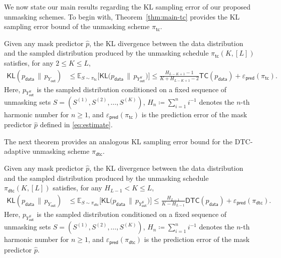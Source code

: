 \documentclass[english]{article}
\newcommand{\defn}{\coloneqq}
\newcommand{\KL}{\mathsf{KL}}
\newcommand{\wh}{\widehat}
\newcommand{\data}{\mathsf{data}}
\newcommand{\veps}{\varepsilon}
\newcommand{\E}{\mathbb{E}}
\newcommand{\TC}{\mathsf{TC}}
\newcommand{\DTC}{\mathsf{DTC}}
\newcommand{\tc}{\mathsf{tc}}
\newcommand{\dtc}{\mathsf{dtc}}
\newcommand{\train}{\mathsf{pred}}
\newcommand{\out}{\mathsf{out}}
\begin{document}
We now state our main results regarding the KL sampling error of our proposed unmasking schemes.
To begin with, Theorem~\ref{thm:main-tc} provides the KL sampling error bound of the unmasking scheme $\pi_{\tc}$. 
\begin{theorem}\label{thm:main-tc}
Given any mask predictor $\wh p$, the KL divergence between the data distribution  and the sampled distribution produced by the unmasking schedule $\pi_{\tc}(K, [L])$ 
satisfies, for any $2 \leq K \leq L$,
\begin{align}\label{eq:main-results-tc}
 \KL(p_{\data} \,\|\, p_{Y_\out}) 
 &\leq \E_{S\sim \pi_{\tc}}\big[\KL(p_{\data} \,\|\, p_{Y_\out^S}\big)\big] \leq \frac{H_{L-K+1} - 1}{K + H_{L-K+1} - 2}  \TC(p_\data) + \veps_{\train}(\pi_{\tc}).
\end{align}
Here, $p_{Y_\out^S} $ is the sampled distribution conditioned on a fixed sequence of unmasking sets $S = (S^{(1)}, S^{(2)}, \ldots, S^{(K)})$,
$H_n \defn \sum_{i=1}^{n} i^{-1}$ denotes the $n$-th harmonic number for $n \geq 1$, and
$\veps_{\train}(\pi_{\tc})$ is the prediction error of the mask predictor $\wh p$ defined in \eqref{eq:estimate}.
\end{theorem}

The next theorem provides an analogous KL sampling error bound for the DTC-adaptive unmasking scheme $\pi_{\dtc}$.
\begin{theorem}\label{thm:main-dtc}
Given any mask predictor $\wh p$, the KL divergence between the data distribution  and the sampled distribution produced by the unmasking schedule $\pi_{\dtc}(K, [L])$ 
satisfies, for any $H_{L-1} < K \leq L$,
\begin{align}\label{eq:main-results-dtc}
 \KL(p_{\data} \,\|\, p_{Y_\out}) 
 &\leq \E_{S\sim \pi_{\dtc}}\big[\KL(p_{\data} \,\|\, p_{Y_\out^S}\big)\big] \leq \frac{H_{L-1}}{K - H_{L-1} }  \DTC(p_\data) + \veps_{\train}(\pi_{\dtc}).
\end{align}
Here, $p_{Y_\out^S} $ is the sampled distribution conditioned on a fixed sequence of unmasking sets $S = (S^{(1)}, S^{(2)}, \ldots, S^{(K)})$, $H_n \defn \sum_{i=1}^{n} i^{-1}$ denotes the $n$-th harmonic number for $n \geq 1$, and
$\veps_{\train}(\pi_{\dtc})$ is the prediction error of the mask predictor $\wh p$.
\end{theorem}
\end{document}
